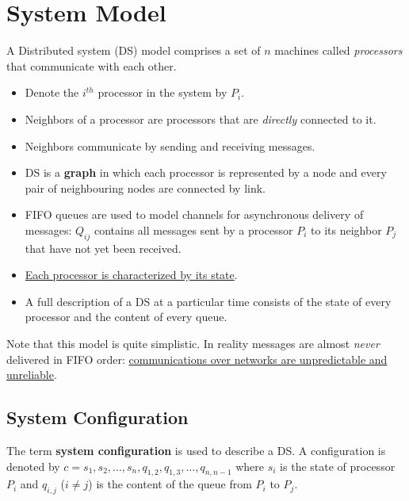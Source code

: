 \section{System Model}
A Distributed system (DS) model comprises a set of $n$ machines called \textit{processors} that communicate with each other.
\begin{itemize}
   \item Denote the $i^{th}$ processor in the system by $P_i$.
   \item Neighbors of a processor are processors that are \textit{directly} connected to it.
   \item Neighbors communicate by sending and receiving messages.
   \item DS is a \textbf{graph} in which each processor is represented by a node and every pair of neighbouring nodes are connected by link.
   \item FIFO queues are used to model channels for asynchronous delivery of messages: $Q_{ij}$ contains all messages sent by a processor $P_i$ to its neighbor $P_j$ that have not yet been received.
   \item \ul{Each processor is characterized by its state}.
   \item A full description of a DS at a particular time consists of the state of every processor and the content of every queue.
\end{itemize}
Note that this model is quite simplistic. In reality messages are almost \textit{never} delivered in FIFO order: \ul{communications over networks are unpredictable and unreliable}.

\subsection{System Configuration}
The term \textbf{system configuration} is used to describe a DS.
A configuration is denoted by $c = {s_1,s_2,\ldots,s_n,q_{1,2},q_{1,3},\ldots,q_{n,n-1}}$ where $s_i$ is the state of processor $P_i$ and $q_{i,j}$ ($i \neq j$) is the content of the queue from $P_i$ to $P_j$.

